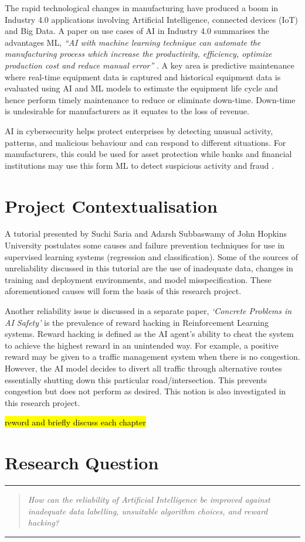 The rapid technological changes in manufacturing have produced a boom 
in Industry 4.0 applications involving Artificial Intelligence, connected
 devices (IoT) and Big Data. A paper on use cases of AI in Industry 4.0 
 summarises the advantages ML, \textit{“AI with machine learning technique can 
 automate the manufacturing process which increase the productivity, 
 efficiency, optimize production cost and reduce manual error” }\cite{9004327}. A 
 key area is predictive maintenance where real-time equipment data is 
 captured and historical equipment data is evaluated using AI and ML 
 models to estimate the equipment life cycle and hence perform timely 
 maintenance to reduce or eliminate down-time. Down-time is undesirable
for manufacturers as it equates to the loss of revenue.

AI in cybersecurity helps protect enterprises by detecting unusual 
activity, patterns, and malicious behaviour and can respond to different 
situations. For manufacturers, this could be used for asset protection 
while banks and financial institutions may use this form ML to detect suspicious 
activity and fraud \cite{9004327}. 

\section{Project Contextualisation}
A tutorial presented by Suchi Saria and Adarsh Subbaswamy of John Hopkins University \cite{saria2019tutorial} postulates some causes and failure prevention techniques for use in supervised learning systems (regression and classification). 
Some of the sources of unreliability discussed in this tutorial are the use of inadequate data, changes in training and deployment environments, and model misspecification. 
These aforementioned causes will form the basis of this research project.

\enlargethispage{-\baselineskip}
Another reliability issue is discussed in a separate paper, \textit{‘Concrete Problems in AI Safety’} \cite{Amodei} is the prevalence of reward hacking in Reinforcement Learning systems. 
Reward hacking is defined as the AI agent’s ability to cheat the system to achieve the highest reward in an unintended way. 
For example, a positive reward may be given to a traffic management system when there is no congestion. However, the AI model decides to divert all traffic through alternative routes essentially shutting down this particular road/intersection. 
This prevents congestion but does not perform as desired. This notion is also investigated in this research project.

\hl{reword and briefly discuss each chapter}

\section{Research Question}
\noindent\rule{\linewidth}{0.4pt}
\begin{quotation}
\textit{How can the reliability of Artificial Intelligence be improved against 
inadequate data labelling, unsuitable algorithm choices, and reward 
hacking?}
\end{quotation}
\noindent\rule{\linewidth}{0.4pt}
